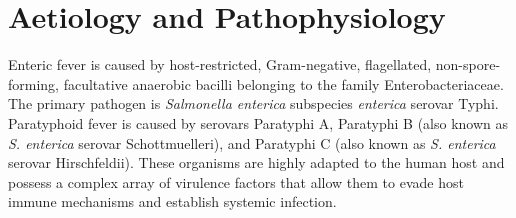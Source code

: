 \section*{Aetiology and Pathophysiology}
Enteric fever is caused by host-restricted, Gram-negative, flagellated, non-spore-forming, facultative anaerobic bacilli belonging to the family Enterobacteriaceae. The primary pathogen is \textit{Salmonella enterica} subspecies \textit{enterica} serovar Typhi. Paratyphoid fever is caused by serovars Paratyphi A, Paratyphi B (also known as \textit{S. enterica} serovar Schottmuelleri), and Paratyphi C (also known as \textit{S. enterica} serovar Hirschfeldii). These organisms are highly adapted to the human host and possess a complex array of virulence factors that allow them to evade host immune mechanisms and establish systemic infection.

